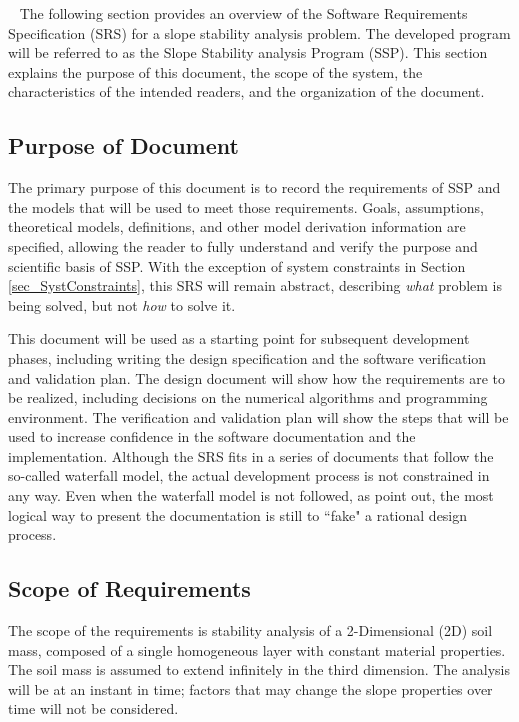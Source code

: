 \documentclass[12pt]{article}
\newcommand{\progname}{SSP}
\begin{document}
~\newline
The following section provides an overview of the Software Requirements 
Specification (SRS) for a slope stability analysis problem. The developed 
program will be referred to as the Slope Stability analysis Program 
(\progname). This section explains the purpose of this document, the 
scope of the system, the characteristics of the intended readers, and the 
organization of the document.

\subsection{Purpose of Document}

The primary purpose of this document is to record the requirements of  
\progname{} and the models that will be used to meet those requirements. Goals, 
 assumptions,  theoretical models, definitions, and other model derivation 
 information are specified, allowing the reader to fully understand and verify 
 the purpose and scientific basis of \progname. With the exception of system 
 constraints in Section \ref{sec_SystConstraints}, this SRS will remain 
 abstract, describing \textit{what} problem is being solved, but not 
 \textit{how} to solve it.
~\newline

\noindent This document will be used as a starting point for subsequent 
development 
phases, including writing the design specification and the software verification
 and validation plan. The design document will show how the requirements
 are to be realized, including decisions on the numerical algorithms and 
programming environment. The verification and validation plan will show
 the steps that will be used to increase confidence in the software 
 documentation
 and the implementation. Although the SRS fits in a series of documents 
that follow the so-called waterfall model, the actual development process
 is not constrained in any way. Even when the waterfall model is not followed, 
as \cite{ParnasAndClements1986} point out, the most logical 
way to present the documentation is still to ``fake" a rational design process.

\subsection{Scope of Requirements} 

The scope of the requirements is stability analysis of a 2-Dimensional (2D)
soil mass, composed of a single homogeneous layer with constant material 
properties. The soil mass is assumed to extend infinitely in the third 
dimension. The analysis will be at an instant in time; factors that may change 
the slope properties over time will not be considered.
\end{document}
